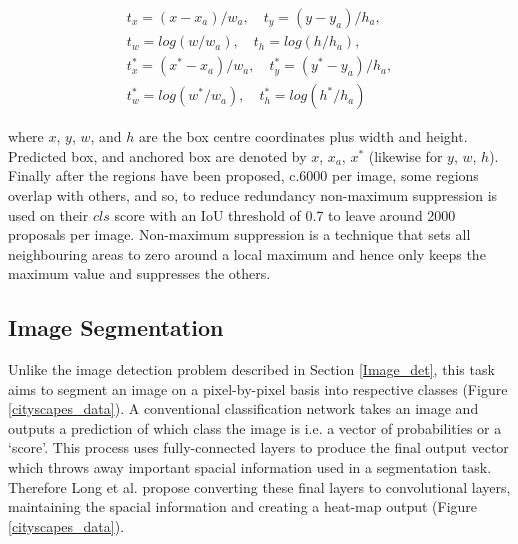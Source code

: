 \documentclass[11pt,twoside]{report}
\begin{document}
\begin{align*}
\label{bounding_box_loss}
t_{x} = (x-x_{a})/w_{a}, \quad t_{y} = (y-y_{a})/h_{a},\\
t_{w} = log(w/w_{a}), \quad t_{h} = log(h/h_{a}), \\
t_{x}^{*} = (x^{*}-x_{a})/w_{a},\quad t_{y}^{*} = (y^{*} - y_{a})/h_{a}, \\
t_{w}^{*} = log(w^{*}/w_{a}), \quad t_{h}^{*} = log(h^{*}/h_{a})
\end{align*}

where $x$, $y$, $w$, and $h$ are the box centre coordinates plus width and height. Predicted box, and anchored box are denoted by $x$, $x_{a}$, $x^{*}$ (likewise for $y$, $w$, $h$).
\newline \newline
Finally after the regions have been proposed, c.6000 per image, some regions overlap with others, and so, to reduce redundancy non-maximum suppression is used on their $cls$ score with an IoU threshold of 0.7 to leave around 2000 proposals per image. Non-maximum suppression is a technique that sets all neighbouring areas to zero around a local maximum and hence only keeps the maximum value and suppresses the others.

\subsection{Image Segmentation}\label{image_seg}
Unlike the image detection problem described in Section \ref{Image_det}, this task aims to segment an image on a pixel-by-pixel basis into respective classes (Figure \ref{cityscapes_data}). A conventional classification network takes an image and outputs a prediction of which class the image is i.e. a vector of probabilities or a `score'. This process uses fully-connected layers to produce the final output vector which throws away important spacial information used in a segmentation task. Therefore Long et al. \cite{DBLP:journals/corr/LongSD14} propose converting these final layers to convolutional layers, maintaining the spacial information and creating a heat-map output (Figure \ref{cityscapes_data}).
\end{document}
